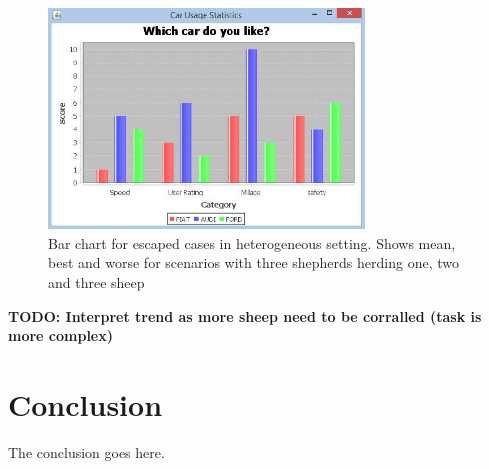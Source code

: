 \documentclass[conference]{IEEEtran}
\begin{document}
\begin{figure}[ht]
	\centering
	\includegraphics[width=3.3in]{imgs/barchart.jpg}
	\caption{Bar chart for escaped cases in heterogeneous setting. Shows mean, best and worse for scenarios with three shepherds herding one, two and three sheep}
	\label{fig:escaped_threeShepherd}
\end{figure}

\textbf{TODO: Interpret trend as more sheep need to be corralled (task is more complex)}


\section{Conclusion}
The conclusion goes here.






\end{document}
